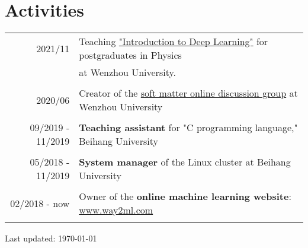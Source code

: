 \documentclass[a4paper,10pt]{article} %
\begin{document}
\section{Activities}
\begin{tabular}{r|l}	
	2021/11                        & Teaching \href{https://github.com/way2ml/forum/discussions/13}{"Introduction to Deep Learning"} for postgraduates in Physics \\ & at Wenzhou University.\\
	\multicolumn{2}{c}{} \\	%
	 
	
	2020/06                        & Creator of the \href{https://github.com/HuangJiaLian/SoftMatterDiscuss}{soft matter online discussion group} at Wenzhou University\\
	\multicolumn{2}{c}{} \\	%
	
	09/2019 - 11/2019                     & \textbf{Teaching assistant }for  "C programming language," Beihang University \\   	
	\multicolumn{2}{c}{} \\	%
	
	05/2018 - 11/2019                     & \textbf{System manager} of the Linux cluster at Beihang University\\
	\multicolumn{2}{c}{} \\	%
	
	02/2018 - now                     & Owner of the \textbf{online machine learning website}: \href{www.way2ml.com}{www.way2ml.com} \\
	\multicolumn{2}{c}{} \\	%
\end{tabular}

\begin{flushright} 
Last updated: {\today}
\end{flushright}
\end{document}
